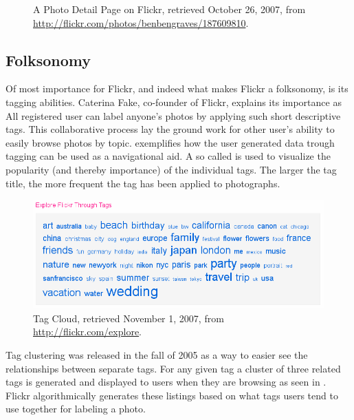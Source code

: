 \begin{figure}
\begin{whole}
\begin{minipage}[t]{0.475\wholewidth}
      \caption[Flickr Photo Detail Page]{%
         A Photo Detail Page on Flickr,
         retrieved October 26, 2007, from
         \url{http://flickr.com/photos/benbengraves/187609810}.}
      \label{figure:scrsh.flickr.photo.detail}
    \end{minipage}
  \end{whole}
  \normalcaption
\end{figure}

\subsection{Folksonomy}
Of most importance
for Flickr, and indeed what makes Flickr a folksonomy, is its tagging
abilities. Caterina Fake, co-founder of Flickr, explains its importance as
All registered user can label anyone's photos by applying such short
descriptive tags. This collaborative process lay the ground work for other
user's ability to easily browse photos by topic.
exemplifies how the user generated data trough tagging can be used as a
navigational aid. A so called  is used to visualize the
popularity (and thereby importance) of the individual tags. The larger the
tag title, the more frequent the tag has been applied to photographs.

\begin{figure}
  \begin{whole}
    \includegraphics[width=\wholewidth]{scrsh_flickr_tagcloud}
    \caption[Flickr Tag Cloud]{%
       Tag Cloud,
       retrieved November 1, 2007, from \url{http://flickr.com/explore}.}
    \label{figure:scrsh.flickr.tagcloud}
  \end{whole}
\end{figure}

Tag clustering was released in the fall of 2005 \citep{butterfield05} as a way
to easier see the relationships between separate tags. For any given tag a
cluster of three related tags is generated and displayed to users when they
are browsing as seen in
.
Flickr algorithmically generates these listings based on what tags users tend
to use together for labeling a photo.

